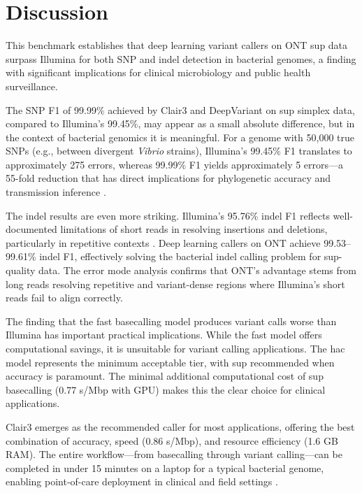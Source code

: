 \documentclass[11pt]{article}
\begin{document}
\section{Discussion}

This benchmark establishes that deep learning variant callers on ONT sup data surpass Illumina for both SNP and indel detection in bacterial genomes, a finding with significant implications for clinical microbiology and public health surveillance.

The SNP F1 of 99.99\% achieved by Clair3 and DeepVariant on sup simplex data, compared to Illumina's 99.45\%, may appear as a small absolute difference, but in the context of bacterial genomics it is meaningful. For a genome with 50,000 true SNPs (e.g., between divergent \textit{Vibrio} strains), Illumina's 99.45\% F1 translates to approximately 275 errors, whereas 99.99\% F1 yields approximately 5 errors---a 55-fold reduction that has direct implications for phylogenetic accuracy and transmission inference \citep{didelot2012,croucher2013}.

The indel results are even more striking. Illumina's 95.76\% indel F1 reflects well-documented limitations of short reads in resolving insertions and deletions, particularly in repetitive contexts \citep{dePristo2011}. Deep learning callers on ONT achieve 99.53--99.61\% indel F1, effectively solving the bacterial indel calling problem for sup-quality data. The error mode analysis confirms that ONT's advantage stems from long reads resolving repetitive and variant-dense regions where Illumina's short reads fail to align correctly.

The finding that the fast basecalling model produces variant calls worse than Illumina has important practical implications. While the fast model offers computational savings, it is unsuitable for variant calling applications. The hac model represents the minimum acceptable tier, with sup recommended when accuracy is paramount. The minimal additional computational cost of sup basecalling (0.77 s/Mbp with GPU) makes this the clear choice for clinical applications.

Clair3 emerges as the recommended caller for most applications, offering the best combination of accuracy, speed (0.86 s/Mbp), and resource efficiency (1.6 GB RAM). The entire workflow---from basecalling through variant calling---can be completed in under 15 minutes on a laptop for a typical bacterial genome, enabling point-of-care deployment in clinical and field settings \citep{kwong2015}.
\end{document}
